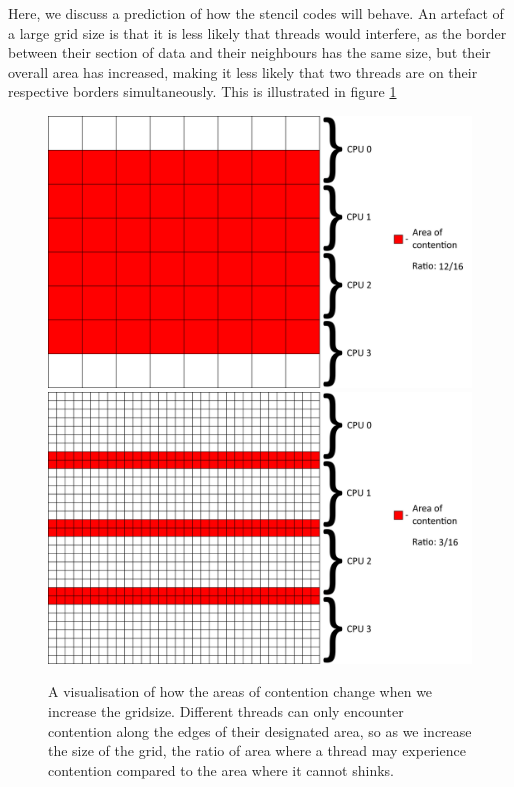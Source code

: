 Here, we discuss a prediction of how the stencil codes will behave. An artefact of a large grid size is that it is less likely that threads would interfere, as the border between their section of data and their neighbours has the same size, but their overall area has increased, making it less likely that two threads are on their respective borders simultaneously. This is illustrated in figure \ref{fig:grid_comparison}

\begin{figure}[H]
    \includegraphics[width=1\textwidth]{graphics/8_with_info.png}
    \includegraphics[width=1\textwidth]{graphics/32_with_info.png}
    \caption{A visualisation of how the areas of contention change when we increase the gridsize. Different threads can only encounter contention along the edges of their designated area, so as we increase the size of the grid, the ratio of area where a thread may experience contention compared to the area where it cannot shinks.}
    \label{fig:grid_comparison}
\end{figure}

